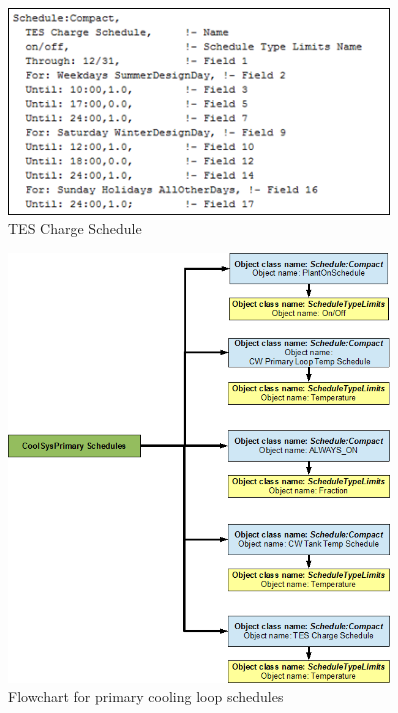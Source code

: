 \begin{figure}[hbtp] %
\centering
\includegraphics[width=0.9\textwidth, height=0.9\textheight, keepaspectratio=true]{media/image055.png}
\caption{TES Charge Schedule \protect \label{fig:tes-charge-schedule}}
\end{figure}

\begin{figure}[htbp] %
\centering
\includegraphics[width=0.9\textwidth, height=0.9\textheight, keepaspectratio=true]{media/image056.png}
\caption{Flowchart for primary cooling loop schedules \protect \label{fig:flowchart-for-primary-cooling-loop-schedules}}
\end{figure}

